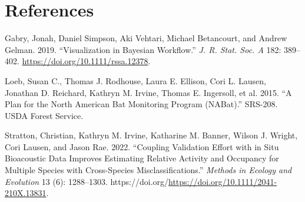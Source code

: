 \documentclass[
]{article}
\newlength{\cslhangindent}
\newenvironment{CSLReferences}[2] %
 {\begin{list}{}{%
  \setlength{\itemindent}{0pt}
  \setlength{\leftmargin}{0pt}
  \setlength{\parsep}{0pt}
  \ifodd #1
   \setlength{\leftmargin}{\cslhangindent}
   \setlength{\itemindent}{-1\cslhangindent}
  \fi
  \setlength{\itemsep}{#2\baselineskip}}}
 {\end{list}}
\begin{document}
\section*{References}\label{references}

\label{refs}
\begin{CSLReferences}{1}{0}
Gabry, Jonah, Daniel Simpson, Aki Vehtari, Michael Betancourt, and Andrew Gelman. 2019. {``Visualization in Bayesian Workflow.''} \emph{J. R. Stat. Soc. A} 182: 389--402. \url{https://doi.org/10.1111/rssa.12378}.

Loeb, Susan C., Thomas J. Rodhouse, Laura E. Ellison, Cori L. Lausen, Jonathan D. Reichard, Kathryn M. Irvine, Thomas E. Ingersoll, et al. 2015. {``A Plan for the {N}orth {A}merican Bat Monitoring Program ({NAB}at).''} SRS-208. USDA Forest Service.

Stratton, Christian, Kathryn M. Irvine, Katharine M. Banner, Wilson J. Wright, Cori Lausen, and Jason Rae. 2022. {``Coupling Validation Effort with in Situ Bioacoustic Data Improves Estimating Relative Activity and Occupancy for Multiple Species with Cross-Species Misclassifications.''} \emph{Methods in Ecology and Evolution} 13 (6): 1288--1303. https://doi.org/\url{https://doi.org/10.1111/2041-210X.13831}.

\end{CSLReferences}
\end{document}
